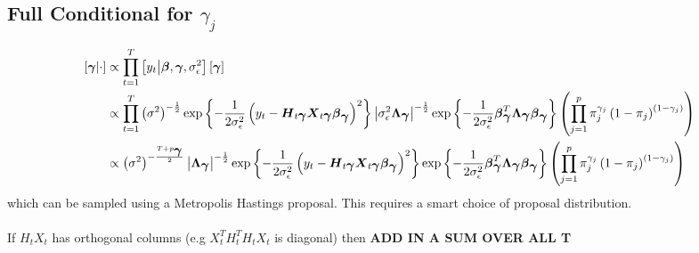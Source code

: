 \documentclass[fleqn]{article}
\def\bm#1{\mbox{\boldmath $#1$}}
\begin{document}
\subsection{Full Conditional for $\gamma_j$}
%
\begin{align*}
%
\left[ \bm{\gamma} \middle| \cdot \right] & \propto \prod_{t = 1}^T \left[ y_t \middle| \bm{\beta}, \bm{\gamma}, \sigma^2_\epsilon \right] \left[ \bm{\gamma} \right] \\
%
& \propto \prod_{t = 1}^T \left( \sigma^2 \right)^{ - \frac{1} {2} } \exp{ \left\{ - \frac{1} {2 \sigma^2_\epsilon} \left( y_t - \bm{H}_{t \bm{\gamma}} \bm{X}_{t \bm{\gamma}} \bm{\beta}_{\bm{\gamma}} \right)^2 \right\} } \left| \sigma^2_\epsilon \bm{\Lambda}_{\bm{\gamma}} \right|^{ - \frac{1} {2}} \exp{ \left\{ - \frac{1} {2 \sigma^2_\epsilon} \bm{\beta}_{\bm{\gamma}}^T \bm{\Lambda}_{\bm{\gamma}} \bm{\beta}_{\bm{\gamma}} \right\} } \left( \prod_{j = 1}^p \pi_j^{\gamma_j} \left( 1 - \pi_j \right)^{ \left( 1 - \gamma_j \right) } \right) \\
%
& \propto \left( \sigma^2 \right)^{ - \frac{T + p_{\bm{\gamma}}} {2} } \left| \bm{\Lambda}_{\bm{\gamma}} \right|^{ - \frac{1} {2} } \exp{ \left\{ - \frac{1} {2 \sigma^2_\epsilon} \left( y_t - \bm{H}_{t \bm{\gamma}} \bm{X}_{t \bm{\gamma}} \bm{\beta}_{\bm{\gamma}} \right)^2 \right\} } \exp{ \left\{ - \frac{1} {2 \sigma^2_\epsilon} \bm{\beta}_{\bm{\gamma}}^T \bm{\Lambda}_{\bm{\gamma}} \bm{\beta}_{\bm{\gamma}} \right\} } \left( \prod_{j = 1}^p \pi_j^{\gamma_j} \left( 1 - \pi_j \right)^{ \left( 1 - \gamma_j \right) } \right) \\
%
\end{align*}
%
which can be sampled using a Metropolis Hastings proposal. This requires a smart choice of proposal distribution.\\
\\
%
If $H_t X_t$ has orthogonal columns (e.g $X_t^T H_t^T H_t X_t$ is diagonal) then \textbf{ADD IN A SUM OVER ALL T}
%
\end{document}
